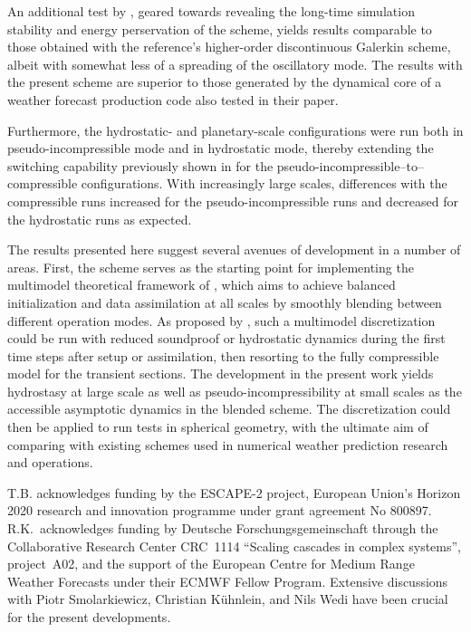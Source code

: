 \documentclass{ametsoc}
\theoremstyle{definition}
\begin{document}
An additional test by \citet{BaldaufBrdar2013}, geared towards revealing the long-time simulation stability and energy perservation of the scheme, yields results comparable to those obtained with the reference's higher-order discontinuous Galerkin scheme, albeit with somewhat less of a spreading of the oscillatory mode. The results with the present scheme are superior to those generated by the dynamical core of a weather forecast production code also tested in their paper. 

Furthermore, the hydrostatic- and planetary-scale configurations were run both in pseudo-incompressible mode and in hydrostatic mode, thereby extending the switching capability previously shown in \cite{BenacchioEtAl2014} for the pseudo-incompressible--to--compressible configurations. With increasingly large scales, differences with the compressible runs increased for the pseudo-incompressible runs and decreased for the hydrostatic runs as expected.

The results presented here suggest several avenues of development in a number of areas. First, the scheme serves as the starting point for implementing the multimodel theoretical framework of \cite{KleinBenacchio2016}, which aims to achieve balanced initialization and data assimilation at all scales by smoothly blending between different operation modes. As proposed by \cite{BenacchioEtAl2014}, such a multimodel discretization could be run with reduced soundproof or hydrostatic dynamics during the first time steps after setup or assimilation, then resorting to the fully compressible model for the transient sections. The development in the present work yields hydrostasy at large scale as well as pseudo-incompressibility at small scales as the accessible asymptotic dynamics in the blended scheme. The discretization could then be applied to run tests in spherical geometry, with the ultimate aim of comparing with existing schemes used in numerical weather prediction research and operations.


\acknowledgments

T.B. acknowledges funding by the ESCAPE-2 project, European Union's Horizon 2020 research and innovation programme under grant agreement No 800897. R.K.\ acknowledges funding by Deutsche Forschungsgemeinschaft through the Collaborative Research Center CRC~1114 ``Scaling cascades in complex systems'', project~A02, and the support of the European Centre for Medium Range Weather Forecasts under their ECMWF Fellow Program. Extensive discussions with Piotr Smolarkiewicz, Christian K\"uhnlein, and Nils Wedi have been crucial for the present developments. 




\end{document}
